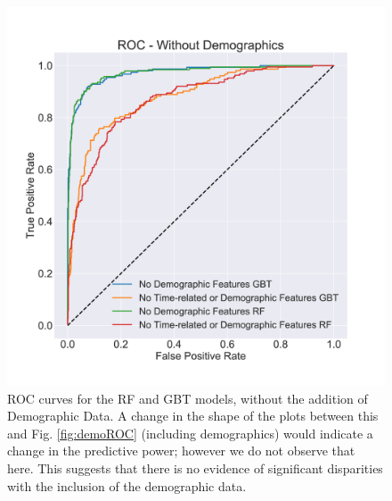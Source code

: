 \documentclass{AISB2008}
\begin{document}
\begin{figure}[h!]
\begin{center}
\includegraphics[width=0.70\columnwidth]{figures/ROC_without_demographics1/ROC_nodemo}
\caption{ROC curves for the RF and GBT models, without the addition of Demographic Data. A change in the shape of the plots between this and Fig. \ref{fig:demoROC} (including demographics) would indicate a change in the predictive power; however we do not observe that here. This suggests that there is no evidence of significant disparities with the inclusion of the demographic data.
\label{fig:nodemoROC}%
}
\end{center}
\end{figure}
\end{document}
